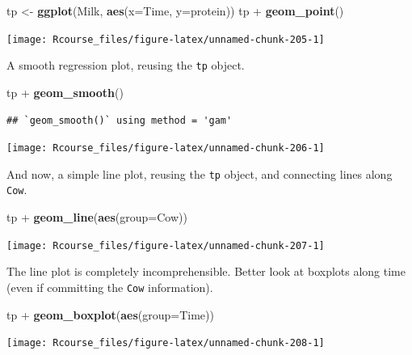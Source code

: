 \documentclass[]{book}
\newenvironment{Shaded}{\begin{snugshade}}{\end{snugshade}}
\newcommand{\KeywordTok}[1]{\textcolor[rgb]{0.13,0.29,0.53}{\textbf{{#1}}}}
\newcommand{\DataTypeTok}[1]{\textcolor[rgb]{0.13,0.29,0.53}{{#1}}}
\newcommand{\StringTok}[1]{\textcolor[rgb]{0.31,0.60,0.02}{{#1}}}
\newcommand{\NormalTok}[1]{{#1}}
\theoremstyle{definition}
\theoremstyle{definition}
\theoremstyle{remark}
\begin{document}
\begin{Shaded}
\begin{Highlighting}[]
\NormalTok{tp <-}\StringTok{ }\KeywordTok{ggplot}\NormalTok{(Milk, }\KeywordTok{aes}\NormalTok{(}\DataTypeTok{x=}\NormalTok{Time, }\DataTypeTok{y=}\NormalTok{protein))}
\NormalTok{tp +}\StringTok{ }\KeywordTok{geom_point}\NormalTok{()}
\end{Highlighting}
\end{Shaded}

\texttt{[image: Rcourse\_files/figure-latex/unnamed-chunk-205-1]}

A smooth regression plot, reusing the \texttt{tp} object.

\begin{Shaded}
\begin{Highlighting}[]
\NormalTok{tp +}\StringTok{ }\KeywordTok{geom_smooth}\NormalTok{()}
\end{Highlighting}
\end{Shaded}

\begin{verbatim}
## `geom_smooth()` using method = 'gam'
\end{verbatim}

\texttt{[image: Rcourse\_files/figure-latex/unnamed-chunk-206-1]}

And now, a simple line plot, reusing the \texttt{tp} object, and
connecting lines along \texttt{Cow}.

\begin{Shaded}
\begin{Highlighting}[]
\NormalTok{tp +}\StringTok{ }\KeywordTok{geom_line}\NormalTok{(}\KeywordTok{aes}\NormalTok{(}\DataTypeTok{group=}\NormalTok{Cow))}
\end{Highlighting}
\end{Shaded}

\texttt{[image: Rcourse\_files/figure-latex/unnamed-chunk-207-1]}

The line plot is completely incomprehensible. Better look at boxplots
along time (even if committing the \texttt{Cow} information).

\begin{Shaded}
\begin{Highlighting}[]
\NormalTok{tp +}\StringTok{ }\KeywordTok{geom_boxplot}\NormalTok{(}\KeywordTok{aes}\NormalTok{(}\DataTypeTok{group=}\NormalTok{Time))}
\end{Highlighting}
\end{Shaded}

\texttt{[image: Rcourse\_files/figure-latex/unnamed-chunk-208-1]}
\end{document}

